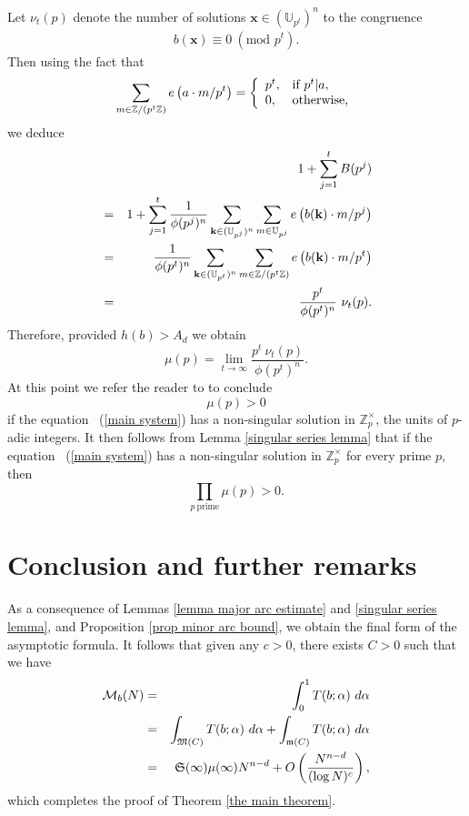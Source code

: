 \documentclass[12pt]{amsart}
\theoremstyle{definition}
\theoremstyle{remark}
\numberwithin{equation}{section}
\begin{document}
Let $\nu_t(p)$ denote the number of solutions $\mathbf{x} \in (\mathbb{U}_{p^t})^n$
to the congruence
\begin{eqnarray}
b( \mathbf{x} ) \equiv 0 \  (\text{mod } p^t).
\end{eqnarray}
Then using the fact that
\begin{eqnarray}
\notag
\sum_{ {m} \in \mathbb{Z}/(p^t \mathbb{Z} ) } e \left(  a  \cdot {m}/p^t  \right) =
\left\{
    \begin{array}{ll}
         p^{t},
         &\mbox{if } p^t | a ,\\
         0,
         &\mbox{otherwise,}
    \end{array}
\right.
\end{eqnarray}
we deduce
\begin{eqnarray}
&&1 + \sum_{j=1}^t B(p^j)
\notag
\\
&=&
1 + \sum_{j=1}^t  \frac{1}{\phi(p^j)^n} \sum_{\mathbf{k} \in (\mathbb{U}_{p^j})^{n}}   \sum_{ {m} \in \mathbb{U}_{p^j} }
 e \left(  {b}(\mathbf{k})  \cdot {m}/p^j  \right)
\notag
\\
&=& \frac{1}{\phi(p^t)^n} \sum_{\mathbf{k} \in (\mathbb{U}_{p^t})^{n}}   \sum_{ {m} \in \mathbb{Z}/(p^t \mathbb{Z} ) } e \left(  {b}(\mathbf{k})  \cdot {m}/p^t  \right)
\notag
\\
&=&  \frac{p^{t}}{\phi(p^t)^n } \ \nu_t(p).
\notag
\end{eqnarray}
Therefore, provided  $h({b}) > A_{d}$ we obtain
$$
\mu(p) = \lim_{t \rightarrow \infty}  \frac{  p^{t } \ \nu_t(p) }{ \phi(p^t)^n }.
$$
At this point we refer the reader to \cite[pp. 704, 736]{CM} to conclude
$$
\mu(p) > 0
$$
if the equation ~(\ref{main system}) has a non-singular solution in $\mathbb{Z}_p^{\times}$, the units of $p$-adic integers.
It then follows from Lemma \ref{singular series lemma} that if the equation ~(\ref{main system}) has a non-singular solution in $\mathbb{Z}_p^{\times}$
for every prime $p$, then
$$
\prod_{p \ \text{prime}}\mu(p) > 0.
$$

\section{Conclusion and further remarks}
\label{sec concln}
As a consequence of Lemmas \ref{lemma major arc estimate} and \ref{singular series lemma}, and
Proposition \ref{prop minor arc bound}, we obtain the final form of the asymptotic formula.
It follows that given any $c > 0$, there exists $C>0$ such that we have
\begin{eqnarray}
\mathcal{M}_{{b}}(N)
&=& \int_0^1 T({b}; {\alpha} ) \ {d}{\alpha}
\notag
\\
&=& \int_{\mathfrak{M}(C) } T({b}; {\alpha} ) \ {d} {\alpha} + \int_{\mathfrak{m}(C)} T({b}; {\alpha} ) \ {d} {\alpha}
\notag
\\
&=&  \mathfrak{S}(\infty) \mu(\infty) N^{n - d} + O \left(  \frac{N^{n-d}}{ (\log N)^c }  \right),
\end{eqnarray}
which completes the proof of Theorem \ref{the main theorem}.
\end{document}
